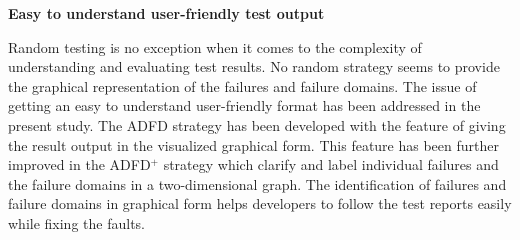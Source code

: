 \textbf{Easy to understand user-friendly test output}

Random testing is no exception when it comes to the complexity of understanding and evaluating test results. No random strategy seems to provide the graphical representation of the failures and failure domains. The issue of getting an easy to understand user-friendly format has been addressed in the present study. The ADFD strategy has been developed with the feature of giving the result output in the visualized graphical form. This feature has been further improved in the ADFD$^+$ strategy which clarify and label individual failures and the failure domains in a two-dimensional graph. The identification of failures and failure domains in graphical form helps developers to follow the test reports easily while fixing the faults.  \\




